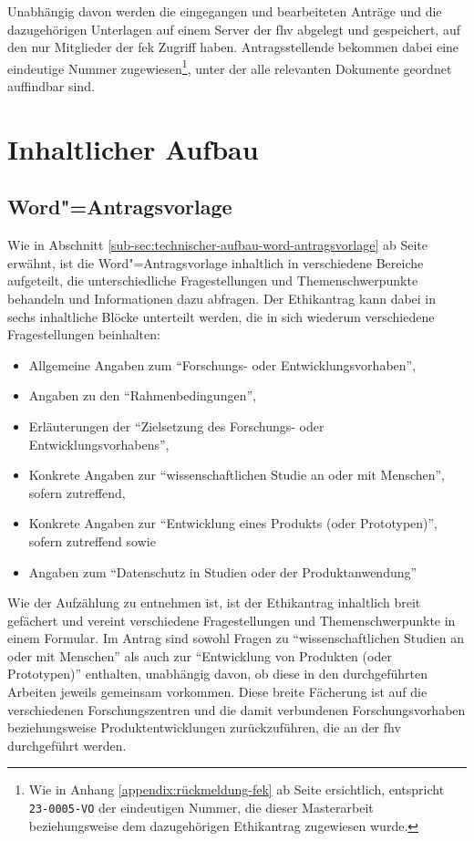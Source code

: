 \documentclass[a4paper,12pt,twoside]{scrreprt}
\begin{document}
Unabhängig davon werden die eingegangen und bearbeiteten Anträge und die dazugehörigen Unterlagen auf einem Server der \acl{fhv} abgelegt und gespeichert, auf den nur Mitglieder der \ac{fek} Zugriff haben. Antragsstellende bekommen dabei eine eindeutige Nummer zugewiesen\footnote{Wie in Anhang \ref{appendix:rückmeldung-fek} ab Seite \pageref{appendix:rückmeldung-fek} ersichtlich, entspricht \texttt{23-0005-VO} der eindeutigen Nummer, die dieser Masterarbeit beziehungsweise dem dazugehörigen Ethikantrag zugewiesen wurde.}, unter der alle relevanten Dokumente geordnet auffindbar sind.

\section{Inhaltlicher Aufbau}
\label{sec:inhaltlicher-aufbau}

\subsection{Word"=Antragsvorlage}
\label{sub-sec:inhaltlicher-aufbau-word-antragsvorlage}

Wie in Abschnitt \ref{sub-sec:technischer-aufbau-word-antragsvorlage} ab Seite \pageref{sub-sec:technischer-aufbau-word-antragsvorlage} erwähnt, ist die Word"=Antragsvorlage inhaltlich in verschiedene Bereiche aufgeteilt, die unterschiedliche Fragestellungen und Themenschwerpunkte behandeln und Informationen dazu abfragen. Der Ethikantrag kann dabei in sechs inhaltliche Blöcke unterteilt werden, die in sich wiederum verschiedene Fragestellungen beinhalten:
\begin{itemize}
    \item Allgemeine Angaben zum \enquote{Forschungs- oder Entwicklungsvorhaben},
    \item Angaben zu den \enquote{Rahmenbedingungen},
    \item Erläuterungen der \enquote{Zielsetzung des Forschungs- oder Entwicklungsvorhabens},
    \item Konkrete Angaben zur \enquote{wissenschaftlichen Studie an oder mit Menschen}, sofern zutreffend,
    \item Konkrete Angaben zur \enquote{Entwicklung eines Produkts (oder Prototypen)}, sofern zutreffend sowie
    \item Angaben zum \enquote{Datenschutz in Studien oder der Produktanwendung}
\end{itemize}

Wie der Aufzählung zu entnehmen ist, ist der Ethikantrag inhaltlich breit gefächert und vereint verschiedene Fragestellungen und Themenschwerpunkte in einem Formular. Im Antrag sind sowohl Fragen zu \enquote{wissenschaftlichen Studien an oder mit Menschen} als auch zur \enquote{Entwicklung von Produkten (oder Prototypen)} enthalten, unabhängig davon, ob diese in den durchgeführten Arbeiten jeweils gemeinsam vorkommen. Diese breite Fächerung ist auf die verschiedenen Forschungszentren und die damit verbundenen Forschungsvorhaben beziehungsweise Produktentwicklungen zurückzuführen, die an der \acl{fhv} durchgeführt werden.
\end{document}
